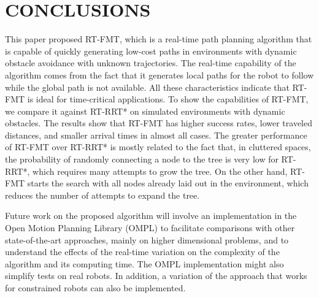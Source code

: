 \section{CONCLUSIONS}
\label{sec:conclusions}

This paper proposed RT-FMT, which is a real-time path planning algorithm that is capable of quickly generating low-cost paths in environments with dynamic obstacle avoidance with unknown trajectories. The real-time capability of the algorithm comes from the fact that it generates local paths for the robot to follow while the global path is not available. All these characteristics indicate that RT-FMT is ideal for time-critical applications. To show the capabilities of RT-FMT, we compare it against RT-RRT* on simulated environments with dynamic obstacles. The results show that RT-FMT has higher success rates, lower traveled distances, and smaller arrival times in almost all cases. The greater performance of RT-FMT over RT-RRT* is mostly related to the fact that, in cluttered spaces, the probability of randomly connecting a node to the tree is very low for RT-RRT*, which requires many attempts to grow the tree. On the other hand, RT-FMT starts the search with all nodes already laid out in the environment, which reduces the number of attempts to expand the tree.





Future work on the proposed algorithm will involve an implementation in the Open Motion Planning Library (OMPL) \cite{sucan2012the-open-motion-planning-library} to facilitate comparisons with other state-of-the-art approaches, mainly on higher dimensional problems, and to understand the effects of the real-time variation on the complexity of the algorithm and its computing time. The OMPL implementation might also simplify tests on real robots. In addition, a variation of the approach that works for constrained robots can also be implemented.


